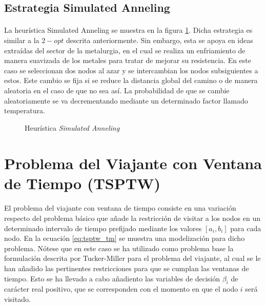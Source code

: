 \documentclass[spanish]{article}
\begin{document}
		\subsection{Estrategia Simulated Anneling}

			\paragraph{}
			La heurística Simulated Anneling se muestra en la figura \ref{code:tsp-simulated-anneling}. Dicha estrategia es similar a la $2-opt$ descrita anteriormente. Sin embargo, esta se apoya en ideas extraídas del sector de la metalurgia, en el cual se realiza un enfriamiento de manera suavizada de los metales para tratar de mejorar su resistencia. En este caso se seleccionan dos nodos al azar y se intercambian los nodos subsiguientes a estos. Este cambio se fija si se reduce la distancia global del camino o de manera aleatoria en el caso de que no sea así. La probabilidad de que se cambie aleatoriamente se va decrementando mediante un determinado factor llamado temperatura.

			\begin{figure}
	      \centering
				\caption{Heurística \emph{Simulated Anneling}}
	      \label{code:tsp-simulated-anneling}
	    \end{figure}

	\section{Problema del Viajante con Ventana de Tiempo (TSPTW)}

		\paragraph{}
		El problema del viajante con ventana de tiempo consiste en una variación respecto del problema básico que añade la restricción de visitar a los nodos en un determinado intervalo de tiempo prefijado mediante los valores $[a_i, b_i]$ para cada nodo. En la ecuación \eqref{eq:tsptw_tm} se muestra una modelización para dicho problema. Nótese que en este caso se ha utilizado como problema base la formulación descrita por Tucker-Miller para el problema del viajante, al cual se le han añadido las pertinentes restricciones para que se cumplan las ventanas de tiempo. Esto se ha llevado a cabo añadiento las variables de decisión $\beta_i$ de carácter real positivo, que se corresponden con el momento en que el nodo $i$ será visitado.
\end{document}
